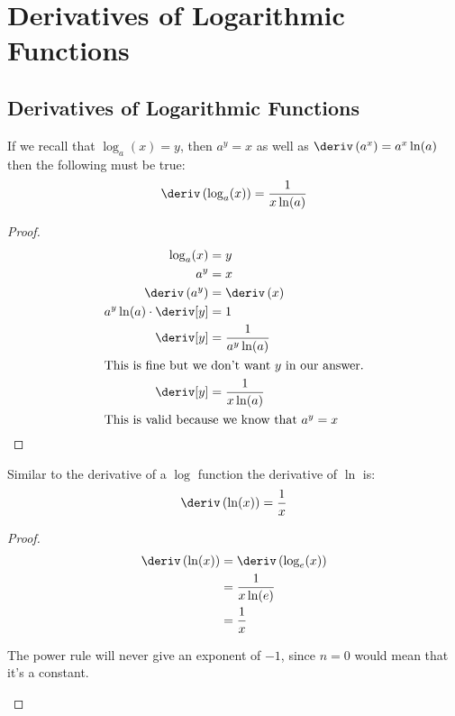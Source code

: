 
\section{Derivatives of Logarithmic Functions}
\subsection{Derivatives of Logarithmic Functions}
\begin{theorem}
    If we recall that $\log_a(x) = y$, then $a^y = x$ as well as $\deriv\left(a^x\right) = a^x \ln(a)$ then the following must be true:
    \begin{equation}
        \deriv \left(\log_a(x)\right) = \dfrac{1}{x\ln(a)}
    \end{equation}
\end{theorem}
\begin{proof}
    \begin{align*}
        \log_a(x) &= y \\
        a^y &= x \\
        \deriv \left(a^y\right)    &= \deriv \left(x\right)\\
        a^y \ln(a) \cdot \deriv[y] &= 1 \\
        \deriv[y]                  &= \dfrac{1}{a^y \ln(a)} \\
        \intertext{This is fine but we don't want $y$ in our answer.}
        \deriv[y]                  &= \dfrac{1}{x \ln(a)} \\
        \intertext{This is valid because we know that $a^y = x$}
    \end{align*}
\end{proof}
\begin{theorem}
    Similar to the derivative of a $\log$ function the derivative of $\ln$ is:
    \begin{equation}
        \deriv\left(\ln(x)\right) = \dfrac{1}{x}
    \end{equation}
\end{theorem}
\begin{proof}
    \begin{align*}
        \deriv\left(\ln(x)\right) &= \deriv \left(\log_e(x)\right) \\
                                  &= \dfrac{1}{x\ln(e)} \\
                                  &= \dfrac{1}{x}
    \end{align*}
    \begin{note}
        The power rule will never give an exponent of $-1$, since $n = 0$ would mean that it's a constant.
    \end{note}
\end{proof}
